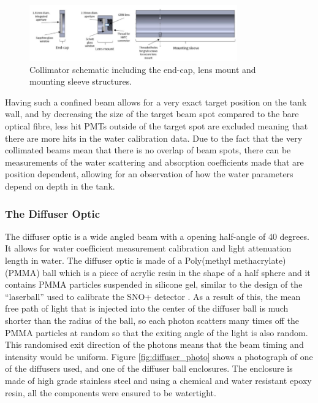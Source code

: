 \begin{figure}
    \centering
    \includegraphics[width=0.8\textwidth]{Figures/collimator_schematic.png}
    \caption{Collimator schematic including the end-cap, lens mount and mounting sleeve structures.}
    \label{fig:collimator_schematic}
\end{figure}

Having such a confined beam allows for a very exact target position on the tank wall, and by decreasing the size of the target beam spot compared to the bare optical fibre, less hit PMTs outside of the target spot are excluded meaning that there are more hits in the water calibration data. Due to the fact that the very collimated beams mean that there is no overlap of beam spots, there can be measurements of the water scattering and absorption coefficients made that are position dependent, allowing for an observation of how the water parameters depend on depth in the tank. 

\subsubsection{The Diffuser Optic}

The diffuser optic is a wide angled beam with a opening half-angle of 40 degrees. It allows for water coefficient measurement calibration and light attenuation length in water. The diffuser optic is made of a Poly(methyl methacrylate) (PMMA) ball which is a piece of acrylic resin in the shape of a half sphere and it contains PMMA particles suspended in silicone gel, similar to the design of the ``laserball'' used to calibrate the SNO+ detector \cite{Moffat_2005}. As a result of this, the mean free path of light that is injected into the center of the diffuser ball is much shorter than the radius of the ball, so each photon scatters many times off the PMMA particles at random so that the exiting angle of the light is also random. This randomised exit direction of the photons means that the beam timing and intensity would be uniform.  
\newline
 Figure \ref{fig:diffuser_photo} shows a photograph of one of the diffusers used, and one of the diffuser ball enclosures. The enclosure is made of high grade stainless steel and using a chemical and water resistant epoxy resin, all the components were ensured to be watertight. 

